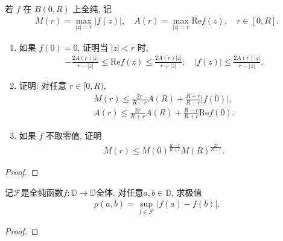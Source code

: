 \documentclass[../../main.tex]{subfiles}%
\begin{document}
\begin{theorem}\label{theorem:Borel-Carathéodory 定理}
若 $f$ 在 $B(0,R)$ 上全纯, 记
\begin{align*}
M(r) = \max\limits_{|z|=r} |f(z)|, \quad A(r) = \max\limits_{|z|=r} \mathrm{Re}f(z), \quad r \in [0,R].
\end{align*}
\begin{enumerate}[(1)]
\item 如果 $f(0) = 0$, 证明当 $|z| < r$ 时,
\begin{align*}
-\frac{2A(r)|z|}{r - |z|} \leqslant \mathrm{Re}f(z) \leqslant \frac{2A(r)|z|}{r + |z|}; \quad |f(z)| \leqslant \frac{2A(r)|z|}{r - |z|}.
\end{align*}

\item 证明: 对任意 $r \in [0,R)$,
\begin{align*}
M(r) \leqslant \frac{2r}{R - r}A(R) + \frac{R + r}{R - r}|f(0)|, \\
A(r) \leqslant \frac{2r}{R + r}A(R) + \frac{R - r}{R + r}\mathrm{Re}f(0).
\end{align*}
\item 如果 $f$ 不取零值, 证明
\begin{align*}
M(r) \leqslant M(0)^{\frac{R-r}{R+r}} M(R)^{\frac{2r}{R+r}}.
\end{align*}
\end{enumerate}
\end{theorem}
\begin{proof}
\end{proof}

\begin{example}
记$\mathscr{F}$是全纯函数$f:\mathbb{D} \to \mathbb{D}$全体. 对任意$a,b \in \mathbb{D}$, 求极值
\begin{align*}
\rho(a,b) = \sup\limits_{f \in \mathscr{F}} |f(a) - f(b)|.
\end{align*}
\end{example}
\begin{proof}

\end{proof}
\end{document}

